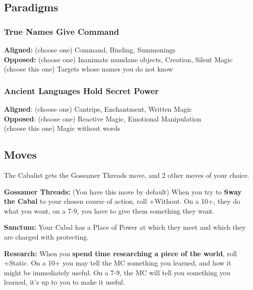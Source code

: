 \documentclass[
  oneside,
  statementpaper,
  9pt]{memoir}
\begin{document}
\hypertarget{paradigms}{%
\subsection{Paradigms}\label{paradigms}}

\hypertarget{true-names-give-command}{%
\subsubsection{True Names Give Command}\label{true-names-give-command}}

\textbf{Aligned:} (choose one) Command, Binding, Summonings\\
\textbf{Opposed:} (choose one) Inanimate mundane objects, Creation,
Silent Magic\\
(choose this one) Targets whose names you do not know

\hypertarget{ancient-languages-hold-secret-power}{%
\subsubsection{Ancient Languages Hold Secret
Power}\label{ancient-languages-hold-secret-power}}

\textbf{Aligned}: (choose one) Cantrips, Enchantment, Written Magic\\
\textbf{Opposed}: (choose one) Reactive Magic, Emotional Manipulation\\
(choose this one) Magic without words

\hypertarget{moves}{%
\subsection{Moves}\label{moves}}

The Cabalist gets the Gossamer Threads move, and 2 other moves of your
choice.

\textbf{Gossamer Threads:} (You have this move by default) When you try
to \textbf{Sway the Cabal} to your chosen course of action, roll
+Without. On a 10+, they do what you want, on a 7-9, you have to give
them something they want.

\textbf{Sanctum:} Your Cabal has a Place of Power at which they meet and
which they are charged with protecting.

\textbf{Research:} When you \textbf{spend time researching a piece of
the world}, roll +Static. On a 10+ you may tell the MC something you
learned, and how it might be immediately useful. On a 7-9, the MC will
tell you something you learned, it's up to you to make it useful.
\end{document}
